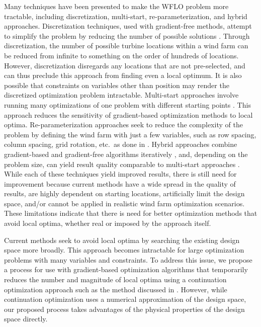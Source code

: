 \documentclass{jpconf}
\begin{document}
Many techniques have been presented to make the WFLO problem more tractable, including discretization, multi-start, re-parameterization, and hybrid approaches. Discretization techniques, used with gradient-free methods, attempt to simplify the problem by reducing the number of possible solutions \cite{mosetti1994, grady2005}. Through discretization, the number of possible turbine locations within a wind farm can be reduced from infinite to something on the order of hundreds of locations. However, discretization disregards any locations that are not pre-selected, and can thus preclude this approach from finding even a local optimum. It is also possible that constraints on variables other than position may render the discretized optimization problem intractable. Multi-start approaches involve running many optimizations of one problem with different starting points \cite{gonzalez2014}. This approach reduces the sensitivity of gradient-based optimization methods to local optima. Re-parameterization approaches seek to reduce the complexity of the problem by defining the wind farm with just a few variables, such as row spacing, column spacing, grid rotation, etc.~as done in \cite{stanley2020}. Hybrid approaches combine gradient-based and gradient-free algorithms iteratively \cite{rethore2014,graf2016, mittal2017}, and, depending on the problem size, can yield result quality comparable to multi-start approaches \cite{rethore2014}. While each of these techniques yield improved results, there is still need for improvement because current methods have a wide spread in the quality of results, are highly dependent on starting locations, artificially limit the design space, and/or cannot be applied in realistic wind farm optimization scenarios. These limitations indicate that there is need for better optimization methods that avoid local optima, whether real or imposed by the approach itself.

Current methods seek to avoid local optima by searching the existing design space more broadly. This approach becomes intractable for large optimization problems with many variables and constraints. To address this issue, we propose a process for use with gradient-based optimization algorithms that temporarily reduces the number and magnitude of local optima using a continuation optimization approach such as the method discussed in \cite{mobahi2015}. However, while continuation optimization uses a numerical approximation of the design space, our proposed process takes advantages of the physical properties of the design space directly. 
\end{document}
